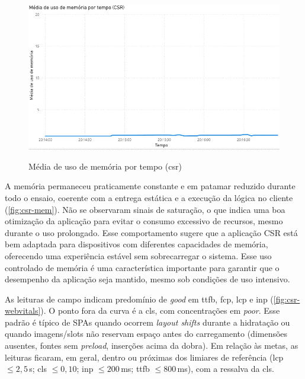 {\begin{figure}[h]
\centering
\caption{Média de uso de memória por tempo (\acrshort{csr})}
\includegraphics[width=1.0\textwidth]{media/uso_memoria_csr.jpeg}
\label{fig:csr-mem}
\end{figure}

A memória permaneceu praticamente constante e em patamar reduzido durante todo o ensaio, coerente com a entrega estática e a execução da lógica no cliente (\autoref{fig:csr-mem}). Não se observaram sinais de saturação, o que indica uma boa otimização da aplicação para evitar o consumo excessivo de recursos, mesmo durante o uso prolongado. Esse comportamento sugere que a aplicação CSR está bem adaptada para dispositivos com diferentes capacidades de memória, oferecendo uma experiência estável sem sobrecarregar o sistema. Esse uso controlado de memória é uma característica importante para garantir que o desempenho da aplicação seja mantido, mesmo sob condições de uso intensivo.

\clearpage
As leituras de campo indicam predomínio de \textit{good} em \acrshort{ttfb}, \acrshort{fcp}, \acrshort{lcp} e \acrshort{inp} (\autoref{fig:csr-webvitals}). O ponto fora da curva é a \acrshort{cls}, com concentrações em \textit{poor}. Esse padrão é típico de SPAs quando ocorrem \emph{layout shifts} durante a hidratação ou quando imagens/slots não reservam espaço antes do carregamento (dimensões ausentes, fontes sem \emph{preload}, inserções acima da dobra). Em relação às metas, as leituras ficaram, em geral, dentro ou próximas dos limiares de referência (\acrshort{lcp} $\leq 2{,}5$\,s; \acrshort{cls} $\leq 0{,}10$; \acrshort{inp} $\leq 200$\,ms; \acrshort{ttfb} $\leq 800$\,ms), com a ressalva da \acrshort{cls}.

}
